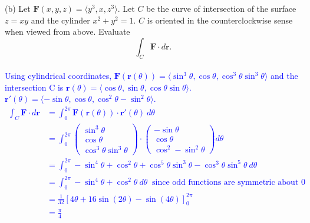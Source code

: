 \documentclass[12pt]{article}
\begin{document}
(b) Let $\mathbf{F}(x,y,z)=\langle y^3,x,z^3\rangle$. Let $C$ be the curve of intersection of the surface $z=xy$ and the cylinder $x^2+y^2=1$. $C$ is oriented in the counterclockwise sense when viewed from above. Evaluate
\[
\int_C \mathbf{F}\cdot d\mathbf{r}.
\]
\\
\textcolor{blue}{
Using cylindrical coordinates, $\mathbf{F}(\mathbf{r}(\theta))=\langle\sin^3\theta,\cos\theta,\cos^3\theta\sin^3\theta\rangle$ and the intersection C is $\mathbf{r}(\theta)=\langle\cos\theta,\sin\theta,\cos\theta\sin\theta\rangle$. $\mathbf{r}'(\theta)=\langle-\sin\theta,\cos\theta,\cos^2\theta-\sin^2\theta\rangle$.
\begin{align*}
	\int_C \mathbf{F}\cdot d\mathbf{r}&=\int_0^{2\pi}\mathbf{F}(\mathbf{r}(\theta))\cdot\mathbf{r}'(\theta)\ d\theta\\
	&=\int_0^{2\pi}\begin{pmatrix}
		\sin^3\theta\\ \cos\theta\\ \cos^3\theta\sin^3\theta
	\end{pmatrix}\cdot\begin{pmatrix}
		-\sin\theta\\ \cos\theta\\ \cos^2-\sin^2\theta
	\end{pmatrix}d\theta\\
	&=\int_0^{2\pi}-\sin^4\theta+\cos^2\theta+\cos^5\theta\sin^3\theta-\cos^3\theta\sin^5\theta\ d\theta\\
	&=\int_0^{2\pi}-\sin^4\theta+\cos^2\theta\ d\theta\ \text{ since odd functions are symmetric about 0}\\
	&=\frac{1}{32}\left[4\theta+16\sin(2\theta)-\sin(4\theta)\right]_0^{2\pi}\\
	&=\frac{\pi}{4}
\end{align*}
}
\end{document}
